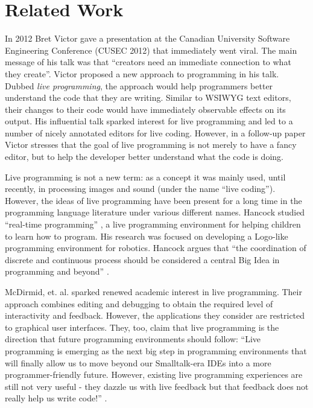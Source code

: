 \section{Related Work}
\label{sec:live}

In 2012 Bret Victor gave a presentation \cite{bretVictorVideo} at the Canadian University Software Engineering Conference (CUSEC 2012) that immediately went viral. The main message of his talk was that ``creators need an immediate connection to what they create''.
Victor proposed a new approach to programming in his talk. Dubbed  {\emph {live programming}}, the approach would help programmers better understand the code that they are writing. Similar to WSIWYG text editors, their changes to their code would have immediately observable effects on its output. His influential talk sparked interest for live programming and led to a number of nicely annotated editors for live coding. However, in a follow-up paper \cite{victor2012} Victor stresses that the goal of live programming is not merely to have a fancy editor, but to help the developer better understand what the code is doing.

Live programming is not a new term: as a concept it was mainly used, until recently, in processing images and sound (under the name ``live coding''). However, the ideas of live programming have been present for a long time in the programming language literature under various different names. Hancock studied ``real-time programming'' \cite{HancockPhDThesis}, a live programming environment for helping children to learn how to program. His research was focused on developing a Logo-like programming environment for robotics. Hancock argues that ``the coordination of discrete and continuous process should be considered a central Big Idea in programming and beyond'' \cite{HancockPhDThesis}.

McDirmid, et. al. \cite{McDirmid13oopsla, BurckhardtFHMMTK13_PLDI, McDirmidE14} sparked renewed academic interest in live programming. Their approach combines editing and debugging to obtain the required level of interactivity and  feedback. However, the applications they consider are restricted to graphical user interfaces. They, too, claim that live programming is the direction that  future programming environments should follow: ``Live programming is emerging as the next big step in programming environments that will finally allow us to move beyond our Smalltalk-era IDEs into a more programmer-friendly future. However, existing live programming experiences are still not very useful - they dazzle us with live feedback but that feedback does not really help us write code!'' \cite{McDirmid13oopsla}.

